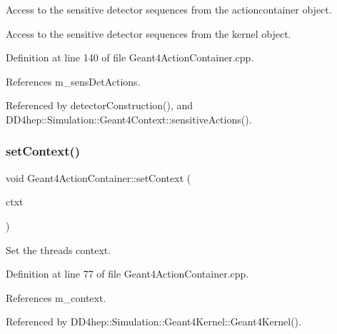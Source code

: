 Access to the sensitive detector sequences from the actioncontainer object. 

Access to the sensitive detector sequences from the kernel object. 

Definition at line 140 of file Geant4\+Action\+Container.\+cpp.



References m\+\_\+sens\+Det\+Actions.



Referenced by detector\+Construction(), and D\+D4hep\+::\+Simulation\+::\+Geant4\+Context\+::sensitive\+Actions().

\hypertarget{class_d_d4hep_1_1_simulation_1_1_geant4_action_container_ae5f4903ca1043137f63f6b9054705b24}{}\label{class_d_d4hep_1_1_simulation_1_1_geant4_action_container_ae5f4903ca1043137f63f6b9054705b24} 
\subsubsection{\texorpdfstring{set\+Context()}{setContext()}}
{\footnotesize\ttfamily void Geant4\+Action\+Container\+::set\+Context (\begin{DoxyParamCaption}\item[{\hyperlink{class_d_d4hep_1_1_simulation_1_1_geant4_context}{Geant4\+Context} $\ast$}]{ctxt }\end{DoxyParamCaption})\hspace{0.3cm}{\ttfamily [protected]}}



Set the thread\textquotesingle{}s context. 



Definition at line 77 of file Geant4\+Action\+Container.\+cpp.



References m\+\_\+context.



Referenced by D\+D4hep\+::\+Simulation\+::\+Geant4\+Kernel\+::\+Geant4\+Kernel().

\hypertarget{class_d_d4hep_1_1_simulation_1_1_geant4_action_container_ad9a53bd3401686eeeb711ef467b2a800}{}\label{class_d_d4hep_1_1_simulation_1_1_geant4_action_container_ad9a53bd3401686eeeb711ef467b2a800} 
